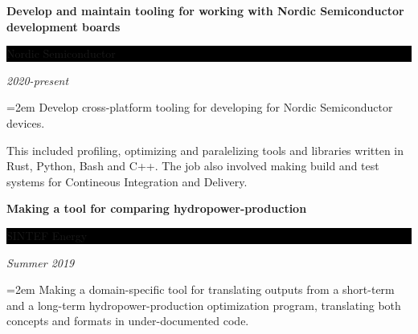 \documentclass[paper=a4,fontsize=11pt,norsk]{scrartcl} %
\newcommand{\EducationEntry}[4]{
		\noindent \textbf{#1} \hfill      %
		\colorbox{Black}{%
			\parbox{6em}{%
			\hfill\color{White}#2}} \par  %
		\noindent \textit{#3} \par        %
		\noindent\hangindent=2em\hangafter=0 \small #4 %
		\normalsize \par}
\begin{document}
\EducationEntry{Develop and maintain tooling for working with Nordic Semiconductor development boards}{Nordic Semiconductor}{2020-present}{
Develop cross-platform tooling for developing for Nordic Semiconductor devices. 


This included profiling, optimizing and paralelizing tools and libraries written in Rust, Python, Bash and C++. 
The job also involved making build and test systems for Contineous Integration and Delivery.


\EducationEntry{Making a tool for comparing hydropower-production}{SINTEF Energy}{Summer 2019}{
Making a domain-specific tool for translating outputs from a short-term and a long-term hydropower-production optimization program, translating both concepts and formats in under-documented code.
}




}
\end{document}

